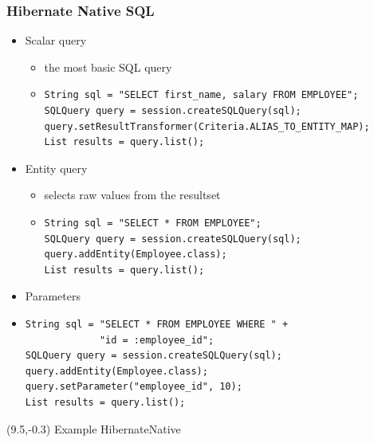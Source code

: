 \documentclass[10pt,xcolor=pdflatex]{beamer}
\begin{document}
\begin{frame}[fragile]\frametitle{Hibernate Native SQL}
	\begin{itemize}
		\item Scalar query
          \begin{itemize}
        	\item the most basic SQL query
            \item[]
                \footnotesize
                \lstset{language=Java}
                \begin{lstlisting}   
String sql = "SELECT first_name, salary FROM EMPLOYEE";
SQLQuery query = session.createSQLQuery(sql);
query.setResultTransformer(Criteria.ALIAS_TO_ENTITY_MAP);
List results = query.list();                
                \end{lstlisting}  
                \normalsize             
          \end{itemize}
		\item Entity query
          \begin{itemize}
        	\item selects raw values from the resultset
            \item[]
                \footnotesize
                \lstset{language=Java}
                \begin{lstlisting}   
String sql = "SELECT * FROM EMPLOYEE";
SQLQuery query = session.createSQLQuery(sql);
query.addEntity(Employee.class);
List results = query.list();                
                \end{lstlisting}  
                \normalsize             
          \end{itemize}
		\item Parameters
        \item[]
        	\footnotesize
            \lstset{language=Java}
            \begin{lstlisting}  
String sql = "SELECT * FROM EMPLOYEE WHERE " +
             "id = :employee_id";
SQLQuery query = session.createSQLQuery(sql);
query.addEntity(Employee.class);
query.setParameter("employee_id", 10);
List results = query.list();            
			\end{lstlisting}  
            \normalsize  
	\end{itemize}
\begin{textblock}{15}(9.5,-0.3)
    {\footnotesize Example HibernateNative}
\end{textblock}
\end{frame}
\end{document}
